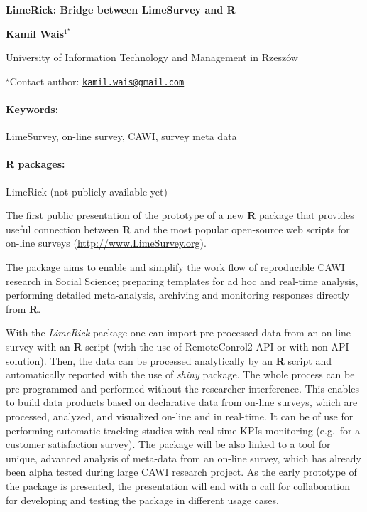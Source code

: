 \documentclass[11pt, a4paper]{article}
\renewcommand{\title}[1]{\begin{center}{\bf \LARGE #1}\end{center}}
\newcommand{\keywords}{\paragraph{Keywords:}}
\newcommand{\packages}{\paragraph{R packages:}}
\begin{document}
\pagestyle{empty}

\title{LimeRick: Bridge between LimeSurvey and R}

\begin{center}
  {\bf Kamil Wais$^{1^\star}$}
\end{center}

\vskip 0.3cm

\begin{affiliations}
\begin{enumerate}
\begin{minipage}{0.915\textwidth}
\centering
\item University of Information Technology and Management in Rzeszów \\[-2pt]
\end{minipage}
\end{enumerate}
$^\star$Contact author: \href{mailto:kamil.wais@gmail.com}{\nolinkurl{kamil.wais@gmail.com}}\\
\end{affiliations}

\vskip 0.5cm

\begin{minipage}{0.915\textwidth}
\keywords LimeSurvey, on-line survey, CAWI, survey meta data
\packages LimeRick (not publicly available yet)
\end{minipage}

\vskip 0.8cm

The first public presentation of the prototype of a new \textbf{R}
package that provides useful connection between \textbf{R} and the most
popular open-source web scripts for on-line surveys
(\url{http://www.LimeSurvey.org}).

The package aims to enable and simplify the work flow of reproducible
CAWI research in Social Science; preparing templates for ad hoc and
real-time analysis, performing detailed meta-analysis, archiving and
monitoring responses directly from \textbf{R}.

With the \emph{LimeRick} package one can import pre-processed data from
an on-line survey with an \textbf{R} script (with the use of
RemoteConrol2 API or with non-API solution). Then, the data can be
processed analytically by an \textbf{R} script and automatically
reported with the use of \emph{shiny} package. The whole process can be
pre-programmed and performed without the researcher interference. This
enables to build data products based on declarative data from on-line
surveys, which are processed, analyzed, and visualized on-line and in
real-time. It can be of use for performing automatic tracking studies
with real-time KPIs monitoring (e.g.~for a customer satisfaction
survey). The package will be also linked to a tool for unique, advanced
analysis of meta-data from an on-line survey, which has already been
alpha tested during large CAWI research project. As the early prototype
of the package is presented, the presentation will end with a call for
collaboration for developing and testing the package in different usage
cases.
\end{document}
